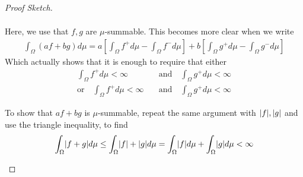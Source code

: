 \begin{proof}[Proof Sketch]
\begin{enumerate}
\begin{align*}
      \end{align*}
      Here, we use that $f,g$ are $\mu$-summable. This becomes more clear when we write
      \begin{align*}
        \int_{\Omega} (af+bg) d \mu
        =
        a\left[
          \int_{\Omega} f^{+} d \mu
          - \int_{\Omega} f^{-} d \mu
        \right]
        + b \left[
          \int_{\Omega} g^{+} d \mu
          - \int_{\Omega} g^{-} d \mu
        \right]
      \end{align*}
      Which actually shows that it is enough to require that either
      \begin{align*}
        \int_{\Omega} f^{+} d \mu < \infty \quad &\text{and} \quad  
        \int_{\Omega} g^{+} d \mu < \infty\\
        \text{or}\quad
        \int_{\Omega} f^{+} d \mu < \infty \quad &\text{and} \quad  
        \int_{\Omega} g^{+} d \mu < \infty
      \end{align*}

      To show that $a f + bg$ is $\mu$-summable, repeat the same argument with $\vert f\vert,\vert g\vert$ and use the triangle inequality, to find
      \begin{align*}
        \int_{\Omega} \abs{f+g} d \mu
        \leq
        \int_{\Omega} \abs{f} + \abs{g} d \mu
        = \int_{\Omega} \abs{f} d \mu + \int_{\Omega} \abs{g} d \mu < \infty
      \end{align*}
  \end{enumerate}
\end{proof}

